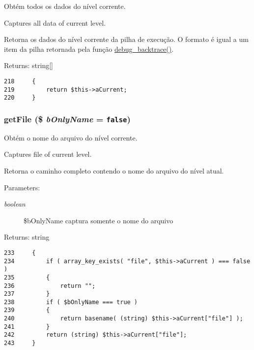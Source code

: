 Obtém todos os dados do nível corrente.

Captures all data of current level.

Retorna os dados do nível corrente da pilha de execução. O formato é igual a um item da pilha retornada pela função \hyperlink{}{debug\_\-backtrace()}.

\begin{Desc}
\item[Returns:]string\mbox{[}\mbox{]} \end{Desc}


\begin{Code}\begin{verbatim}218     {
219         return $this->aCurrent;
220     }
\end{verbatim}
\end{Code}


\hypertarget{class_back_trace_932d18f80cc26b50d2855ce5925a385a}{
\subsubsection[{getFile}]{\setlength{\rightskip}{0pt plus 5cm}getFile (\$ {\em bOnlyName} = {\tt false})}}
\label{class_back_trace_932d18f80cc26b50d2855ce5925a385a}


Obtém o nome do arquivo do nível corrente.

Captures file of current level.

Retorna o caminho completo contendo o nome do arquivo do nível atual.

\begin{Desc}
\item[Parameters:]
\begin{description}
\item[{\em boolean}]\$bOnlyName captura somente o nome do arquivo \end{description}
\end{Desc}
\begin{Desc}
\item[Returns:]string \end{Desc}


\begin{Code}\begin{verbatim}233     {
234         if ( array_key_exists( "file", $this->aCurrent ) === false )
235         {
236             return "";
237         }
238         if ( $bOnlyName === true )
239         {
240             return basename( (string) $this->aCurrent["file"] );
241         }
242         return (string) $this->aCurrent["file"];
243     }
\end{verbatim}
\end{Code}


